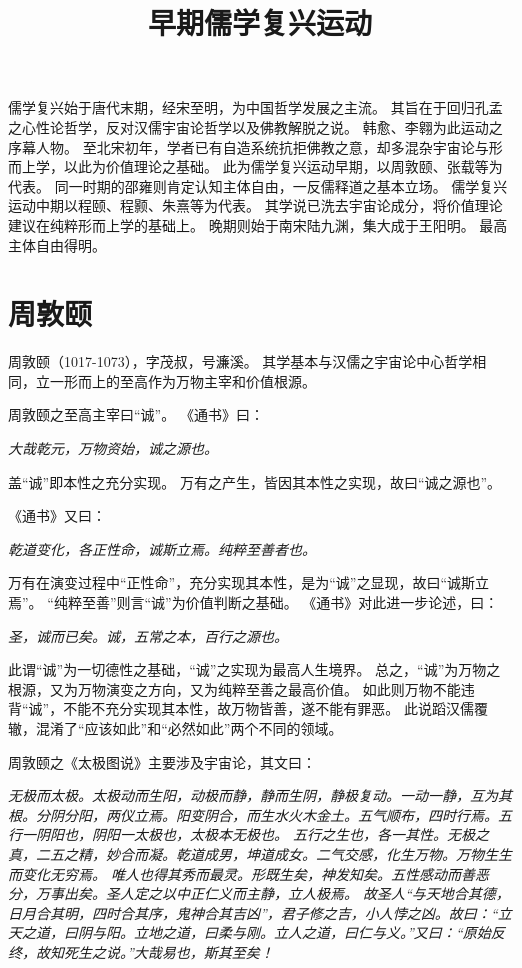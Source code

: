 \documentclass[11pt]{article}
\title{早期儒学复兴运动}
\date{}
\begin{document}
  \maketitle

  \linenumbers

儒学复兴始于唐代末期，经宋至明，为中国哲学发展之主流。
其旨在于回归孔孟之心性论哲学，反对汉儒宇宙论哲学以及佛教解脱之说。
韩愈、李翱为此运动之序幕人物。
至北宋初年，学者已有自造系统抗拒佛教之意，却多混杂宇宙论与形而上学，以此为价值理论之基础。
此为儒学复兴运动早期，以周敦颐、张载等为代表。
同一时期的邵雍则肯定认知主体自由，一反儒释道之基本立场。
儒学复兴运动中期以程颐、程颢、朱熹等为代表。
其学说已洗去宇宙论成分，将价值理论建议在纯粹形而上学的基础上。
晚期则始于南宋陆九渊，集大成于王阳明。
最高主体自由得明。

\section{周敦颐}
周敦颐（1017-1073），字茂叔，号濂溪。
其学基本与汉儒之宇宙论中心哲学相同，立一形而上的至高作为万物主宰和价值根源。

\par

周敦颐之至高主宰曰“诚”。
《通书》曰：

\textit{大哉乾元，万物资始，诚之源也。}

盖“诚”即本性之充分实现。
万有之产生，皆因其本性之实现，故曰“诚之源也”。

《通书》又曰：

\textit{乾道变化，各正性命，诚斯立焉。纯粹至善者也。}

万有在演变过程中“正性命”，充分实现其本性，是为“诚”之显现，故曰“诚斯立焉”。
“纯粹至善”则言“诚”为价值判断之基础。
《通书》对此进一步论述，曰：

\textit{圣，诚而已矣。诚，五常之本，百行之源也。}

此谓“诚”为一切德性之基础，“诚”之实现为最高人生境界。
总之，“诚”为万物之根源，又为万物演变之方向，又为纯粹至善之最高价值。
如此则万物不能违背“诚”，不能不充分实现其本性，故万物皆善，遂不能有罪恶。
此说蹈汉儒覆辙，混淆了“应该如此”和“必然如此”两个不同的领域。

\par

周敦颐之《太极图说》主要涉及宇宙论，其文曰：

\textit{无极而太极。太极动而生阳，动极而静，静而生阴，静极复动。一动一静，互为其根。分阴分阳，两仪立焉。阳变阴合，而生水火木金土。五气顺布，四时行焉。五行一阴阳也，阴阳一太极也，太极本无极也。
\newline
五行之生也，各一其性。无极之真，二五之精，妙合而凝。乾道成男，坤道成女。二气交感，化生万物。万物生生而变化无穷焉。
\newline
唯人也得其秀而最灵。形既生矣，神发知矣。五性感动而善恶分，万事出矣。圣人定之以中正仁义而主静，立人极焉。
\newline
故圣人“与天地合其德，日月合其明，四时合其序，鬼神合其吉凶”，君子修之吉，小人悖之凶。故曰：“立天之道，曰阴与阳。立地之道，曰柔与刚。立人之道，曰仁与义。”又曰：“原始反终，故知死生之说。”大哉易也，斯其至矣！}
\end{document}

